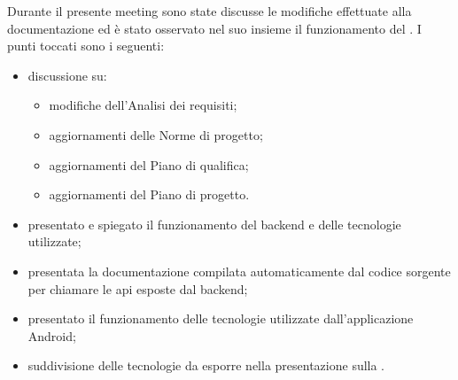 Durante il presente meeting sono state discusse le modifiche effettuate alla documentazione ed è stato osservato nel suo insieme il funzionamento del .
I punti toccati sono i seguenti:
\begin{itemize}
\item discussione su:
   \begin{itemize}
      \item modifiche dell'Analisi dei requisiti;
      \item aggiornamenti delle Norme di progetto;
      \item aggiornamenti del Piano di qualifica;
      \item aggiornamenti del Piano di progetto.
   \end{itemize}
\item presentato e spiegato il funzionamento del backend e delle tecnologie utilizzate;
\item presentata la documentazione compilata automaticamente dal codice sorgente per chiamare le api  esposte dal backend;
\item presentato il funzionamento delle tecnologie utilizzate dall'applicazione Android;
\item suddivisione delle tecnologie da esporre nella presentazione sulla .
\end{itemize}

